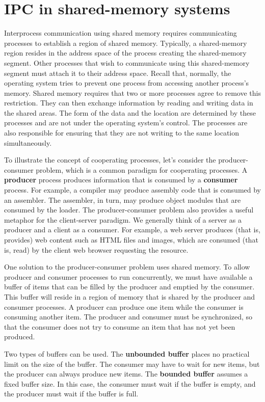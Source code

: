 \section{IPC in shared-memory systems}\label{sec:3.5}

Interprocess communication using shared memory requires communicating processes to establish a region of shared memory. Typically, a shared-memory region resides in the address space of the process creating the shared-memory segment. Other processes that wish to communicate using this shared-memory segment must attach it to their address space. Recall that, normally, the operating system tries to prevent one process from accessing another process's memory. Shared memory requires that two or more processes agree to remove this restriction. They can then exchange information by reading and writing data in the shared areas. The form of the data and the location are determined by these processes and are not under the operating system's control. The processes are also responsible for ensuring that they are not writing to the same location simultaneously.

To illustrate the concept of cooperating processes, let's consider the producer-consumer problem, which is a common paradigm for cooperating processes. A \textbf{producer} process produces information that is consumed by a \textbf{consumer} process. For example, a compiler may produce assembly code that is consumed by an assembler. The assembler, in turn, may produce object modules that are consumed by the loader. The producer-consumer problem also provides a useful metaphor for the client-server paradigm. We generally think of a server as a producer and a client as a consumer. For example, a web server produces (that is, provides) web content such as HTML files and images, which are consumed (that is, read) by the client web browser requesting the resource.

One solution to the producer-consumer problem uses shared memory. To allow producer and consumer processes to run concurrently, we must have available a buffer of items that can be filled by the producer and emptied by the consumer. This buffer will reside in a region of memory that is shared by the producer and consumer processes. A producer can produce one item while the consumer is consuming another item. The producer and consumer must be synchronized, so that the consumer does not try to consume an item that has not yet been produced.

Two types of buffers can be used. The \textbf{unbounded buffer} places no practical limit on the size of the buffer. The consumer may have to wait for new items, but the producer can always produce new items. The \textbf{bounded buffer} assumes a fixed buffer size. In this case, the consumer must wait if the buffer is empty, and the producer must wait if the buffer is full.

